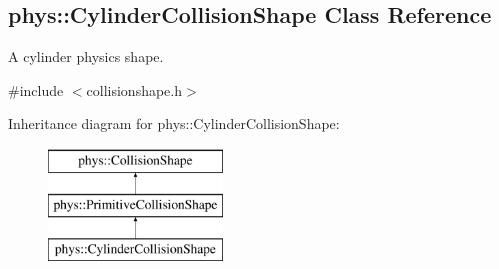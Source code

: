 \hypertarget{classphys_1_1CylinderCollisionShape}{
\subsection{phys::CylinderCollisionShape Class Reference}
\label{classphys_1_1CylinderCollisionShape}
}


A cylinder physics shape.  




{\ttfamily \#include $<$collisionshape.h$>$}

Inheritance diagram for phys::CylinderCollisionShape:\begin{figure}[H]
\begin{center}
\leavevmode
\includegraphics[height=3.000000cm]{classphys_1_1CylinderCollisionShape}
\end{center}
\end{figure}
